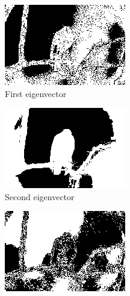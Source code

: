 \documentclass[11pt]{article}
\begin{document}
\begin{figure}
\centering
\graphicspath{{../code/}}
\begin{subfigure}[b]{0.4\textwidth}
\centering
\includegraphics[width=\textwidth]{hawk_10_seg_ev1}
\caption{First eigenvector}
\label{fig:ev1:r10}
\end{subfigure}
\begin{subfigure}[b]{0.4\textwidth}
\centering
\includegraphics[width=\textwidth]{hawk_10_seg}
\caption{Second eigenvector}
\label{fig:ev2:r10}
\end{subfigure}
\begin{subfigure}[b]{0.4\textwidth}
\centering
\includegraphics[width=\textwidth]{hawk_10_seg_ev3}

\end{subfigure}
\end{figure}
\end{document}
